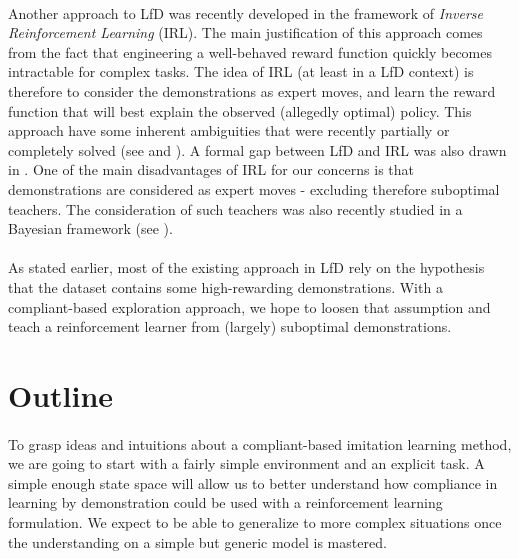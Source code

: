 \documentclass[a4paper]{report}
\begin{document}
{{			\paragraph{} Another approach to LfD was recently developed in the framework of \emph{Inverse Reinforcement Learning} (IRL). The main justification of this approach comes from the fact that engineering a well-behaved reward function quickly becomes intractable for complex tasks. The idea of IRL (at least in a LfD context) is therefore to consider the demonstrations as expert moves, and learn the reward function that will best explain the observed (allegedly optimal) policy. This approach have some inherent ambiguities that were recently partially or completely solved (see \cite{abbeel2004apprenticeship} and \cite{ziebart2008maximum}). A formal gap between LfD and IRL was also drawn in \cite{piot2017}. One of the main disadvantages of IRL for our concerns is that demonstrations are considered as expert moves - excluding therefore suboptimal teachers. The consideration of such teachers was also recently studied in a Bayesian framework (see \cite{choi2015hierarchical}).
			
		\paragraph{} As stated earlier, most of the existing approach in LfD rely on the hypothesis that the dataset contains some high-rewarding demonstrations. With a compliant-based exploration approach, we hope to loosen that assumption and teach a reinforcement learner from (largely) suboptimal demonstrations. 
				
		}
		\section{Outline}
		{
			
			\paragraph{} To grasp ideas and intuitions about a compliant-based imitation learning method, we are going to start with a fairly simple environment and an explicit task. A simple enough state space will allow us to better understand how compliance in learning by demonstration could be used with a reinforcement learning formulation. We expect to be able to generalize to more complex situations once the understanding on a simple but generic model is mastered. 
			
}}
\end{document}
